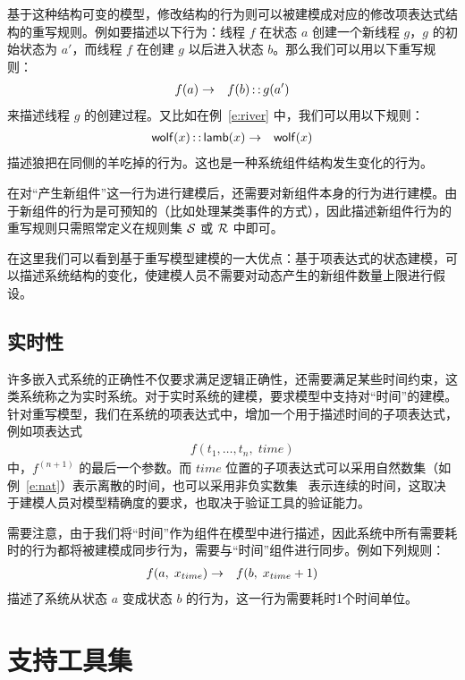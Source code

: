 基于这种结构可变的模型，修改结构的行为则可以被建模成对应的修改项表达式结构的重写规则。例如要描述以下行为：线程 $f$ 在状态 $a$ 创建一个新线程 $g$，$g$ 的初始状态为 $a'$，而线程 $f$ 在创建 $g$ 以后进入状态 $b$。那么我们可以用以下重写规则：
\begin{eqnarray}
f(a) & \rightarrow & f(b) \operatorname{\mathsf{::}} g(a') \nonumber
\end{eqnarray}
来描述线程 $g$ 的创建过程。又比如在例~\ref{e:river} 中，我们可以用以下规则：
\begin{eqnarray}
\operatorname{\mathsf{wolf}}(x)\operatorname{\mathsf{::}}\operatorname{\mathsf{lamb}}(x) & \rightarrow & \operatorname{\mathsf{wolf}}(x) \nonumber
\end{eqnarray}
描述狼把在同侧的羊吃掉的行为。这也是一种系统组件结构发生变化的行为。

在对“产生新组件”这一行为进行建模后，还需要对新组件本身的行为进行建模。由于新组件的行为是可预知的（比如处理某类事件的方式），因此描述新组件行为的重写规则只需照常定义在规则集 $\mathcal{S}$ 或 $\mathcal{R}$ 中即可。

在这里我们可以看到基于重写模型建模的一大优点：基于项表达式的状态建模，可以描述系统结构的变化，使建模人员不需要对动态产生的新组件数量上限进行假设。

\subsection{实时性}

许多嵌入式系统的正确性不仅要求满足逻辑正确性，还需要满足某些时间约束，这类系统称之为实时系统。对于实时系统的建模，要求模型中支持对“时间”的建模。针对重写模型，我们在系统的项表达式中，增加一个用于描述时间的子项表达式，例如项表达式
\begin{eqnarray}
& & f(t_1,\ldots,t_n,\; time) \nonumber
\end{eqnarray}
中，$f^{(n+1)}$ 的最后一个参数。而 $time$ 位置的子项表达式可以采用自然数集（如例~\ref{e:nat}）表示离散的时间，也可以采用非负实数集~\cite{DBLP:journals/tcs/GoguenM92} 表示连续的时间，这取决于建模人员对模型精确度的要求，也取决于验证工具的验证能力。

需要注意，由于我们将“时间”作为组件在模型中进行描述，因此系统中所有需要耗时的行为都将被建模成同步行为，需要与“时间”组件进行同步。例如下列规则：
\begin{eqnarray}
f(a,\; x_{time}) & \rightarrow & f(b,\; x_{time}+1) \nonumber
\end{eqnarray}
描述了系统从状态 $a$ 变成状态 $b$ 的行为，这一行为需要耗时1个时间单位。

\section{支持工具集}

